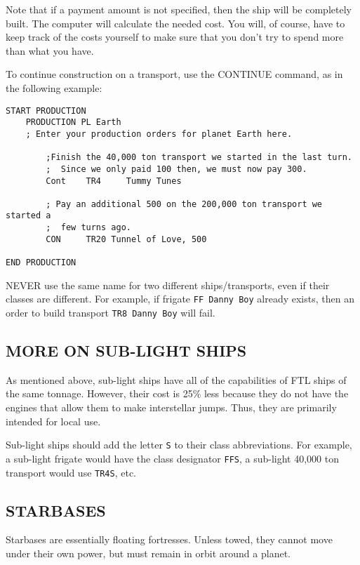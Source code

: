 \documentclass[10pt,titlepage]{article}
\begin{document}
Note that if a payment amount is not specified, then the ship will be
completely built.  The computer will calculate the needed cost.  You will, of
course, have to keep track of the costs yourself to make sure that you don't
try to spend more than what you have.

To continue construction on a transport, use the CONTINUE command, as in the
following example:

\begin{verbatim}
START PRODUCTION
    PRODUCTION PL Earth
    ; Enter your production orders for planet Earth here.

        ;Finish the 40,000 ton transport we started in the last turn.
        ;  Since we only paid 100 then, we must now pay 300.
        Cont    TR4     Tummy Tunes

        ; Pay an additional 500 on the 200,000 ton transport we started a
        ;  few turns ago.
        CON     TR20 Tunnel of Love, 500

END PRODUCTION

\end{verbatim}

NEVER use the same name for two different ships/transports, even if their
classes are different.  For example, if frigate \texttt{FF Danny Boy} already
exists, then an order to build transport \texttt{TR8 Danny Boy} will fail.


\subsection{MORE ON SUB-LIGHT SHIPS}
\label{sec:moreonsublightships}


As mentioned above, sub-light ships have all of the capabilities of FTL ships
of the same tonnage.  However, their cost is 25\% less because they do not
have the engines that allow them to make interstellar jumps.  Thus, they
are primarily intended for local use.

Sub-light ships should add the letter \texttt{S} to their class abbreviations.  For
example, a sub-light frigate would have the class designator \texttt{FFS}, a sub-light
40,000 ton transport would use \texttt{TR4S}, etc.


\subsection{STARBASES}
\label{sec:starbases}


Starbases are essentially floating fortresses.  Unless towed, they cannot
move under their own power, but must remain in orbit around a planet.
\end{document}
